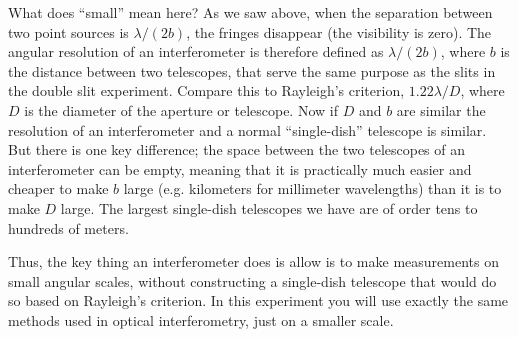 \documentclass[11pt]{article}
\begin{document}
What does ``small'' mean here? As we saw above, when the separation between two point sources is $\lambda/(2b)$, the fringes disappear (the visibility is zero). The angular resolution of an interferometer is therefore defined as $\lambda/(2b)$, where $b$ is the distance between two telescopes, that serve the same purpose as the slits in the double slit experiment. Compare this to Rayleigh's criterion, $1.22 \lambda/D$, where $D$ is the diameter of the aperture or telescope. Now if $D$ and $b$ are similar the resolution of an interferometer and a normal ``single-dish'' telescope is similar. But there is one key difference; the space between the two telescopes of an interferometer can be empty, meaning that it is practically much easier and cheaper to make $b$ large (e.g. kilometers for millimeter wavelengths) than it is to make $D$ large. The largest single-dish telescopes we have are of order tens to hundreds of meters.

Thus, the key thing an interferometer does is allow is to make measurements on small angular scales, without constructing a single-dish telescope that would do so based on Rayleigh's criterion. In this experiment you will use exactly the same methods used in optical interferometry, just on a smaller scale.



\end{document}
